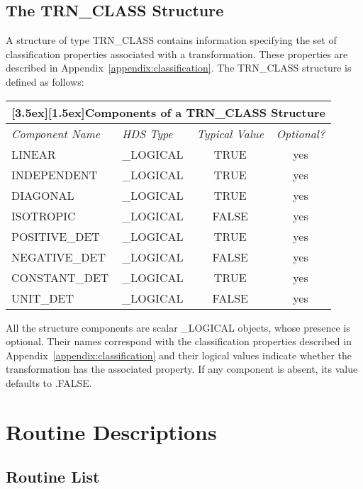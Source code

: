 \documentclass[twoside,11pt]{article}
\newcommand{\xlabel}[1]{}
\newcommand{\name}[1]{\mbox{\small{#1}}}
\begin{document}
\subsection{\xlabel{the_nametrn_class_structure}The \name{TRN\_CLASS} Structure}

A structure of type \name{TRN\_CLASS} contains information specifying the
set of classification properties associated with a transformation. 
These properties are described in Appendix~\ref{appendix:classification}.
The \name{TRN\_CLASS} structure is defined as follows:

\begin{center}

\begin{tabular}{|llc|c|}
\hline
\multicolumn{4}{|c|}{\raisebox{0ex}[3.5ex][1.5ex]{\bf Components of a
\name{TRN\_CLASS} Structure}} \\ 
\hline
\hline
{\em Component Name} & {\em \name{HDS} Type} & {\em Typical Value} & {\em
Optional?} \\ \hline
LINEAR & \_LOGICAL & TRUE & yes \\
INDEPENDENT & \_LOGICAL & TRUE & yes \\
DIAGONAL & \_LOGICAL & TRUE & yes \\
ISOTROPIC & \_LOGICAL & FALSE & yes \\
POSITIVE\_DET & \_LOGICAL & TRUE & yes \\
NEGATIVE\_DET & \_LOGICAL & FALSE & yes \\
CONSTANT\_DET & \_LOGICAL & TRUE & yes \\
UNIT\_DET & \_LOGICAL & FALSE & yes \\
\hline
\end{tabular}

\end{center}

All the structure components are scalar \name{\_LOGICAL} objects, whose
presence is optional. 
Their names correspond with the classification properties described in
Appendix~\ref{appendix:classification} and their logical values indicate
whether the transformation has the associated property. If any component is
absent, its value defaults to \name{.FALSE.} 

\newpage
\section{\xlabel{routine_descriptions}Routine Descriptions}
\label{appendix_routines}

\subsection{\xlabel{routine_list}Routine List}
\end{document}
